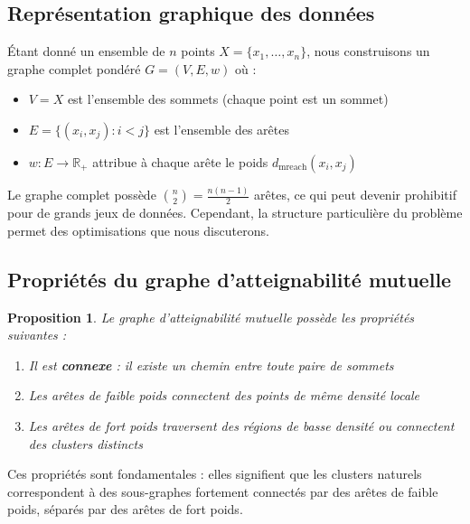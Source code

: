 \documentclass[11pt,a4paper]{article}
\newtheorem{proposition}[definition]{Proposition}
\begin{document}
\subsection{Représentation graphique des données}

Étant donné un ensemble de $n$ points $X = \{x_1, \ldots, x_n\}$, nous construisons un graphe complet pondéré $G = (V, E, w)$ où :
\begin{itemize}
    \item $V = X$ est l'ensemble des sommets (chaque point est un sommet)
    \item $E = \{(x_i, x_j) : i < j\}$ est l'ensemble des arêtes
    \item $w : E \to \mathbb{R}_+$ attribue à chaque arête le poids $d_{\text{mreach}}(x_i, x_j)$
\end{itemize}

Le graphe complet possède $\binom{n}{2} = \frac{n(n-1)}{2}$ arêtes, ce qui peut devenir prohibitif pour de grands jeux de données. Cependant, la structure particulière du problème permet des optimisations que nous discuterons.

\subsection{Propriétés du graphe d'atteignabilité mutuelle}

\begin{proposition}
Le graphe d'atteignabilité mutuelle possède les propriétés suivantes :
\begin{enumerate}
    \item Il est \textbf{connexe} : il existe un chemin entre toute paire de sommets
    \item Les arêtes de faible poids connectent des points de même densité locale
    \item Les arêtes de fort poids traversent des régions de basse densité ou connectent des clusters distincts
\end{enumerate}
\end{proposition}

Ces propriétés sont fondamentales : elles signifient que les clusters naturels correspondent à des sous-graphes fortement connectés par des arêtes de faible poids, séparés par des arêtes de fort poids.
\end{document}
